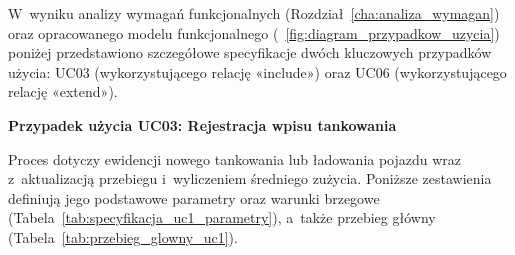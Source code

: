 W~wyniku analizy wymagań funkcjonalnych (Rozdział~\ref{cha:analiza_wymagan}) oraz opracowanego modelu funkcjonalnego (\figurename~\ref{fig:diagram_przypadkow_uzycia}) poniżej przedstawiono szczegółowe specyfikacje dwóch kluczowych przypadków użycia: UC03 (wykorzystującego relację «include») oraz UC06 (wykorzystującego relację «extend»).

\noindent\textbf{Przypadek użycia UC03: Rejestracja wpisu tankowania}

Proces dotyczy ewidencji nowego tankowania lub ładowania pojazdu wraz z~aktualizacją przebiegu i~wyliczeniem średniego zużycia. Poniższe zestawienia definiują jego podstawowe parametry oraz warunki brzegowe (Tabela~\ref{tab:specyfikacja_uc1_parametry}), a~także przebieg główny (Tabela~\ref{tab:przebieg_glowny_uc1}).

\begingroup
\renewcommand{\arraystretch}{1.3}
\setlength{\LTcapwidth}{\linewidth}
